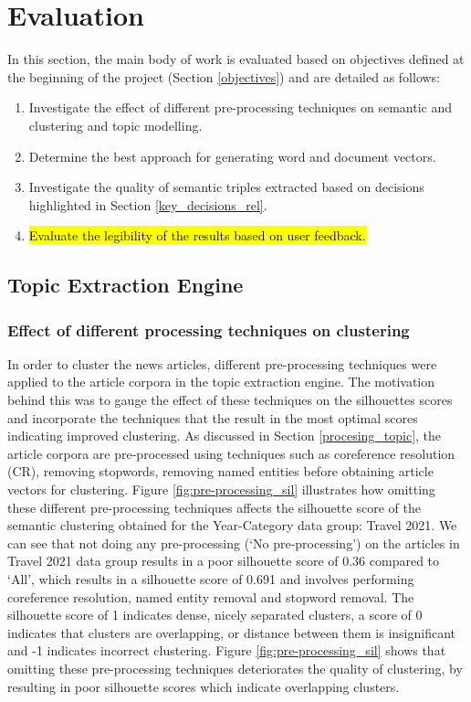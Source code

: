 \chapter{Evaluation}

In this section, the main body of work is evaluated based on objectives defined at the beginning of the project (Section \ref{objectives}) and are detailed as follows:
\begin{enumerate}
    \item Investigate the effect of different pre-processing techniques on semantic and clustering and topic modelling.
    \item Determine the best approach for generating word and document vectors.
    \item Investigate the quality of semantic triples extracted based on decisions highlighted in Section \ref{key_decisions_rel}.
    \item \hl{Evaluate the legibility of the results based on user feedback.}
\end{enumerate}



\section{Topic Extraction Engine}

\subsection{Effect of different processing techniques on clustering} \label{s:preprocess_clustering}

In order to cluster the news articles, different pre-processing techniques were applied to the article corpora in the topic extraction engine. The motivation behind this was to gauge the effect of these techniques on the silhouettes scores and incorporate the techniques that the result in the most optimal scores indicating improved clustering. As discussed in Section \ref{procesing_topic}, the article corpora are pre-processed using techniques such as coreference resolution (CR), removing stopwords, removing named entities before obtaining article vectors for clustering. Figure \ref{fig:pre-processing_sil} illustrates how omitting these different pre-processing techniques affects the silhouette score of the semantic clustering obtained for the Year-Category data group: Travel 2021. We can see that not doing any pre-processing (`No pre-processing') on the articles in Travel 2021 data group results in a poor silhouette score of 0.36 compared to `All', which results in a silhouette score of 0.691 and involves performing coreference resolution, named entity removal and stopword removal. The silhouette score of 1 indicates dense, nicely separated clusters, a score of 0 indicates that clusters are overlapping, or distance between them is insignificant and -1 indicates incorrect clustering. Figure  \ref{fig:pre-processing_sil} shows that omitting these pre-processing techniques deteriorates the quality of clustering, by resulting in poor silhouette scores which indicate overlapping clusters.

